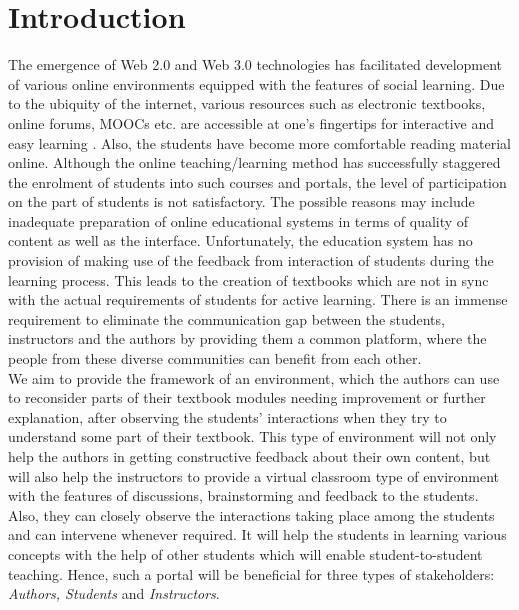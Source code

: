 \documentclass{llncs}
\begin{document}
\section{Introduction}\label{sec:Introduction}

The emergence of Web 2.0 and Web 3.0 technologies has facilitated development of various online environments equipped with the features of social learning\citep{richardson2010blogs}\citep{Kesim2007}\citep{Kolbitsch2006}. Due to the ubiquity of the internet, various resources such as electronic textbooks, online forums, MOOCs etc. are accessible at one’s fingertips for interactive and easy learning \cite{martin2012will}. Also, the students have become more comfortable reading material online.  Although the online teaching/learning method has successfully staggered the enrolment of students into such courses and portals, the level of participation on the part of students is not satisfactory\cite{Anderson}. The possible reasons may include inadequate preparation of online educational systems in terms of quality of content as well as the interface\cite{Vonderwell2005}. Unfortunately, the education system has no provision of making use of the feedback from interaction of students during the learning process. This leads to the creation of textbooks which are not in sync with the actual requirements of students for active learning\cite{Fung2011}. There is an immense requirement to eliminate the communication gap between the students, instructors and the authors by providing them a common platform, where the people from these diverse communities can benefit from each other. \\
We aim to provide the framework of an environment, which the authors can use to reconsider parts of their textbook modules needing improvement or further explanation, after observing the students’ interactions when they try to understand some part of their textbook. This type of environment will not only help the authors in getting constructive feedback about their own content, but will also help the instructors to provide a virtual classroom type of environment with the features of discussions, brainstorming and feedback to the students.  Also, they can closely observe the interactions taking place among the students and can intervene whenever required. It will help the students in learning various concepts with the help of other students which will enable student-to-student teaching. Hence, such a portal will be beneficial for three types of stakeholders: \textit{Authors, Students} and \textit{Instructors}.  \\
\end{document}

